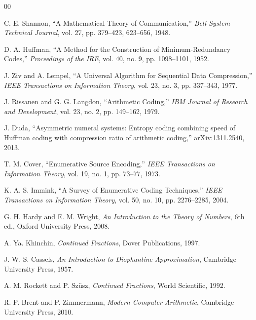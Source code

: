 \documentclass[onecolumn]{IEEEtran}
\begin{document}

\begin{thebibliography}{00}

C. E. Shannon,
``A Mathematical Theory of Communication,''
\emph{Bell System Technical Journal},
vol. 27,
pp. 379--423, 623--656,
1948.

D. A. Huffman,
``A Method for the Construction of Minimum-Redundancy Codes,''
\emph{Proceedings of the IRE},
vol. 40,
no. 9,
pp. 1098--1101,
1952.

J. Ziv and A. Lempel,
``A Universal Algorithm for Sequential Data Compression,''
\emph{IEEE Transactions on Information Theory},
vol. 23,
no. 3,
pp. 337--343,
1977.

J. Rissanen and G. G. Langdon,
``Arithmetic Coding,''
\emph{IBM Journal of Research and Development},
vol. 23,
no. 2,
pp. 149--162,
1979.

J. Duda,
``Asymmetric numeral systems: Entropy coding combining speed of
Huffman coding with compression ratio of arithmetic coding,''
arXiv:1311.2540,
2013.

T. M. Cover,
``Enumerative Source Encoding,''
\emph{IEEE Transactions on Information Theory},
vol. 19,
no. 1,
pp. 73--77,
1973.

K. A. S. Immink,
``A Survey of Enumerative Coding Techniques,''
\emph{IEEE Transactions on Information Theory},
vol. 50,
no. 10,
pp. 2276--2285,
2004.

G. H. Hardy and E. M. Wright,
\emph{An Introduction to the Theory of Numbers},
6th ed.,
Oxford University Press,
2008.

A. Ya. Khinchin,
\emph{Continued Fractions},
Dover Publications,
1997.

J. W. S. Cassels,
\emph{An Introduction to Diophantine Approximation},
Cambridge University Press,
1957.

A. M. Rockett and P. Sz\"usz,
\emph{Continued Fractions},
World Scientific,
1992.

R. P. Brent and P. Zimmermann,
\emph{Modern Computer Arithmetic},
Cambridge University Press,
2010.

\end{thebibliography}
\end{document}
